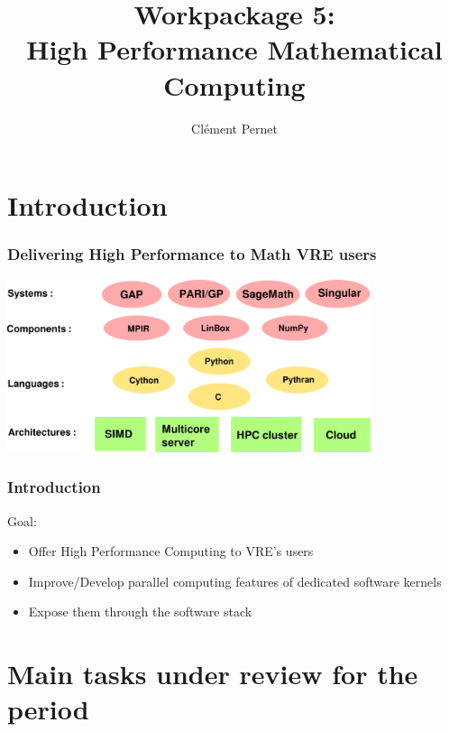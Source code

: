 \documentclass{beamer}
\title[Workpackage 5]{Workpackage 5:\\ High Performance Mathematical Computing}
\author{Clément Pernet}
\institute[UGA]{Université Grenoble Alpes}
\begin{document}
\maketitle

\section*{Introduction}
\begin{frame}
  \frametitle{Delivering High Performance to Math VRE users}
   \begin{center}
    \includegraphics[width=0.8\textwidth]{software_stack}

  \end{center}

\end{frame}

\begin{frame}
  \frametitle{Introduction}
  \begin{block}
    {Goal:}
    \begin{itemize}
    \item Offer High Performance Computing to VRE's users
    \item Improve/Develop parallel computing features of dedicated software
      kernels
    \item Expose them through the software stack
    \end{itemize}
  \end{block}
\end{frame}
\section{Main tasks under review for the period}
\end{document}
